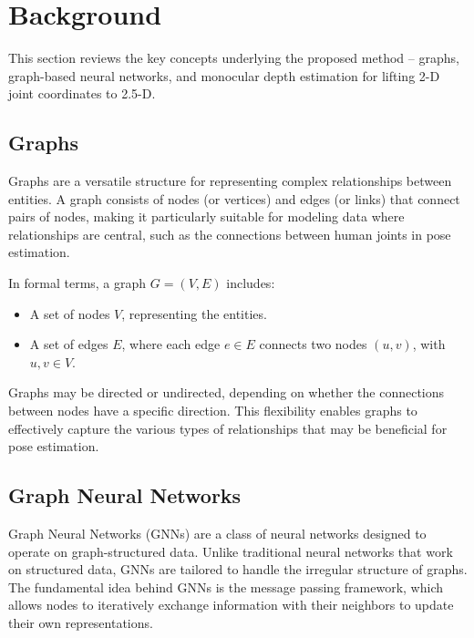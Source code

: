 \section{Background}

This section reviews the key concepts underlying the proposed method -- graphs,
graph-based neural networks, and monocular depth estimation for lifting 2-D
joint coordinates to 2.5-D.

\subsection{Graphs}
Graphs are a versatile structure for representing complex relationships between
entities. A graph consists of nodes (or vertices) and edges (or links) that
connect pairs of nodes, making it particularly suitable for modeling data where
relationships are central, such as the connections between human joints in pose
estimation.

In formal terms, a graph \( G = (V, E) \) includes:
\begin{itemize}
  \item A set of nodes \( V \), representing the entities.
  \item A set of edges \( E \), where each edge \( e \in E \) connects two nodes
  \( (u, v) \), with \( u, v \in V \).
\end{itemize}

Graphs may be directed or undirected, depending on whether the connections
between nodes have a specific direction. This flexibility enables graphs to
effectively capture the various types of relationships that may be beneficial 
for pose estimation.

\subsection{Graph Neural Networks}
Graph Neural Networks (GNNs) \cite{scarselli2008graph} are a class of neural
networks designed to operate on graph-structured data. Unlike traditional neural
networks that work on structured data, GNNs are tailored to handle the irregular
structure of graphs. The fundamental idea behind GNNs is the message passing
framework, which allows nodes to iteratively exchange information with their
neighbors to update their own representations.

